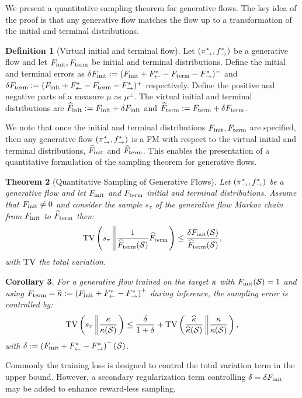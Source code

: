 \documentclass{article}
\theoremstyle{plain}
\newtheorem{theorem}{Theorem}[section]
\newtheorem{corollary}[theorem]{Corollary}
\theoremstyle{definition}
\newtheorem{definition}[theorem]{Definition}
\theoremstyle{remark}
\theoremstyle{fact}
\begin{document}
We present a quantitative sampling theorem for generative flows. The key idea of the proof is that any generative flow matches the flow up to a transformation of the initial and terminal distributions.

\begin{definition}[Virtual initial and terminal flow] Let $(\pi_{\rightarrow}^*,f^*_{\rightarrow})$ be a generative flow and let $F_{\mathrm{init}},F_{\mathrm{term}}$ be initial and terminal distributions. Define the initial and terminal errors as $\delta F_{\mathrm{init}}:=(F_{\mathrm{init}}+F^*_{\leftarrow}-F_{\mathrm{term}}-F^*_{\rightarrow})^-$ and $\delta F_{\mathrm{term}}:=(F_{\mathrm{init}}+F^*_{\leftarrow}-F_{\mathrm{term}}-F^*_{\rightarrow})^+$ respectively. Define the positive and negative parts of a measure $\mu$ as ${\mu}^\pm$.
The virtual initial and terminal distributions are $\widehat {F}_{\mathrm{init}} := F_{\mathrm{init}}+ \delta F_{\mathrm{init}}$ and $\widehat{F}_{\mathrm{term}} := F_{\mathrm{term}}+ \delta F_{\mathrm{term}}$.
\end{definition}

We note that once the initial and terminal distributions $F_{\mathrm{init}},F_{\mathrm{term}}$ are specified, then any generative flow $(\pi_{\rightarrow}^*,f^*_{\rightarrow})$ is a FM with respect to the virtual initial and terminal distributions, $\widehat {F}_{\mathrm{init}}$ and $\widehat{F}_{\mathrm{term}}$. This enables the presentation of a quantitative formulation of the sampling theorem for generative flows. 
\begin{theorem}[Quantitative Sampling of Generative Flows]
\label{theo:negative_control}
    Let $(\pi_{\rightarrow}^*, f^*_{\rightarrow})$ be a generative flow and let $F_{\mathrm{init}}$ and $F_{\mathrm{term}}$ initial and terminal distributions. Assume that $F_{\mathrm{init}}\neq 0$ and consider the sample $s_\tau$ of the generative flow Markov chain from $F_{\mathrm{init}}$ to $\widehat{F}_{\mathrm{term}}$ then:
    \begin{equation}
        \mathrm{TV}\left(s_\tau \left\| \frac{1}{\widehat{F}_{\mathrm{term}}(\mathcal S )} \widehat{F}_{\mathrm{term}}\right.\right) \leq  \frac{\delta F_{\mathrm{init}}(\mathcal S)}{\widehat{F}_{\mathrm{term}}(\mathcal S)},
    \end{equation}
    with $\mathrm{TV}$  the total variation.
\end{theorem}
\begin{corollary} For a generative flow trained on the target $\kappa$ with $F_{\mathrm{init}}(\mathcal S)=1$ and using $F_{\mathrm{term}}=\widehat{\kappa} := \left(F_{\mathrm{init}}+F^*_{\leftarrow}-F^*_{\rightarrow}\right)^+$ during inference, the sampling error is controlled by:
    \begin{eqnarray}
      \mathrm{TV}\left(s_\tau \left\| \frac{\kappa}{\kappa(\mathcal S )} \right.\right) \leq  \frac{\delta}{1+\delta}+\mathrm{TV}\left(\frac{\widehat{\kappa}}{\widehat{\kappa}(\mathcal S)} \left\| \frac{\kappa}{\kappa(\mathcal S )} \right.\right),
\end{eqnarray}
with $\delta :=  \left(F_{\mathrm{init}}+F^*_{\leftarrow}-F^*_{\rightarrow}\right)^-(\mathcal S)$.
\end{corollary}
Commonly the training loss is designed to control the total variation term in the upper bound. However, a secondary regularization term controlling $\delta =\delta F_{\mathrm{init}}$ may be added to enhance reward-less sampling. 
\end{document}
